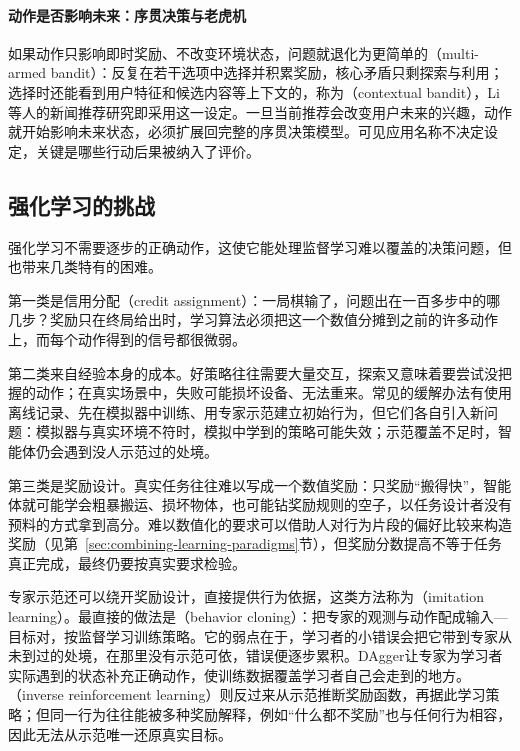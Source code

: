 \paragraph{动作是否影响未来：序贯决策与老虎机}

如果动作只影响即时奖励、不改变环境状态，问题就退化为更简单的（multi-armed bandit）：反复在若干选项中选择并积累奖励，核心矛盾只剩探索与利用；选择时还能看到用户特征和候选内容等上下文的，称为（contextual bandit），Li等人的新闻推荐研究即采用这一设定。一旦当前推荐会改变用户未来的兴趣，动作就开始影响未来状态，必须扩展回完整的序贯决策模型。可见应用名称不决定设定，关键是哪些行动后果被纳入了评价。

\subsection{强化学习的挑战}

强化学习不需要逐步的正确动作，这使它能处理监督学习难以覆盖的决策问题，但也带来几类特有的困难。

第一类是信用分配（credit assignment）：一局棋输了，问题出在一百多步中的哪几步？奖励只在终局给出时，学习算法必须把这一个数值分摊到之前的许多动作上，而每个动作得到的信号都很微弱。

第二类来自经验本身的成本。好策略往往需要大量交互，探索又意味着要尝试没把握的动作；在真实场景中，失败可能损坏设备、无法重来。常见的缓解办法有使用离线记录、先在模拟器中训练、用专家示范建立初始行为，但它们各自引入新问题：模拟器与真实环境不符时，模拟中学到的策略可能失效；示范覆盖不足时，智能体仍会遇到没人示范过的处境。

第三类是奖励设计。真实任务往往难以写成一个数值奖励：只奖励“搬得快”，智能体就可能学会粗暴搬运、损坏物体，也可能钻奖励规则的空子，以任务设计者没有预料的方式拿到高分。难以数值化的要求可以借助人对行为片段的偏好比较来构造奖励（见第~\ref{sec:combining-learning-paradigms}节），但奖励分数提高不等于任务真正完成，最终仍要按真实要求检验。

专家示范还可以绕开奖励设计，直接提供行为依据，这类方法称为（imitation learning）。最直接的做法是（behavior cloning）：把专家的观测与动作配成输入—目标对，按监督学习训练策略。它的弱点在于，学习者的小错误会把它带到专家从未到过的处境，在那里没有示范可依，错误便逐步累积。DAgger让专家为学习者实际遇到的状态补充正确动作，使训练数据覆盖学习者自己会走到的地方。（inverse reinforcement learning）则反过来从示范推断奖励函数，再据此学习策略；但同一行为往往能被多种奖励解释，例如“什么都不奖励”也与任何行为相容，因此无法从示范唯一还原真实目标。

